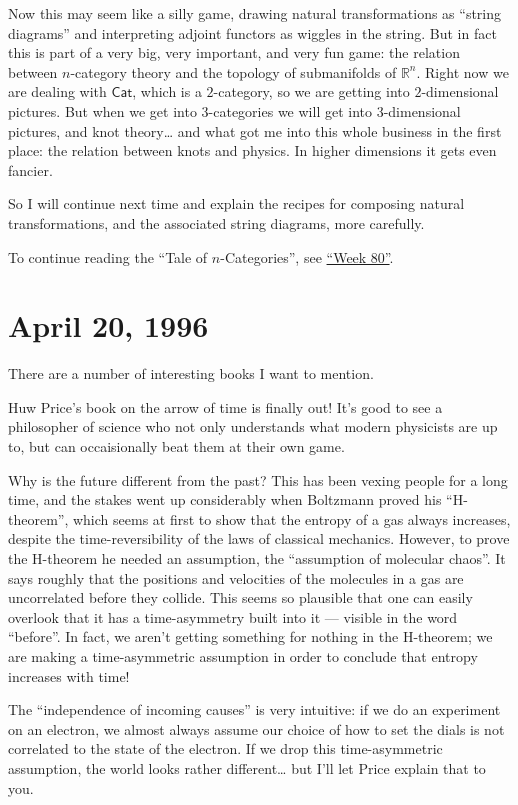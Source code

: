\documentclass{article}
\begin{document}
Now this may seem like a silly game, drawing natural transformations as
``string diagrams'' and interpreting adjoint functors as wiggles in the
string. But in fact this is part of a very big, very important, and very
fun game: the relation between \(n\)-category theory and the topology of
submanifolds of \(\mathbb{R}^n\). Right now we are dealing with
\(\mathsf{Cat}\), which is a \(2\)-category, so we are getting into
\(2\)-dimensional pictures. But when we get into \(3\)-categories we
will get into \(3\)-dimensional pictures, and knot theory\ldots{} and
what got me into this whole business in the first place: the relation
between knots and physics. In higher dimensions it gets even fancier.

So I will continue next time and explain the recipes for composing
natural transformations, and the associated string diagrams, more
carefully.

To continue reading the ``Tale of \(n\)-Categories'', see
\protect\hyperlink{week80}{``Week 80''}.



\hypertarget{week80}{%
\section{April 20, 1996}\label{week80}}

There are a number of interesting books I want to mention.

Huw Price's book on the arrow of time is finally out! It's good to see a
philosopher of science who not only understands what modern physicists
are up to, but can occaisionally beat them at their own game.

Why is the future different from the past? This has been vexing people
for a long time, and the stakes went up considerably when Boltzmann
proved his ``H-theorem'', which seems at first to show that the entropy
of a gas always increases, despite the time-reversibility of the laws of
classical mechanics. However, to prove the H-theorem he needed an
assumption, the ``assumption of molecular chaos''. It says roughly that
the positions and velocities of the molecules in a gas are uncorrelated
before they collide. This seems so plausible that one can easily
overlook that it has a time-asymmetry built into it --- visible in the
word ``before''. In fact, we aren't getting something for nothing in the
H-theorem; we are making a time-asymmetric assumption in order to
conclude that entropy increases with time!

The ``independence of incoming causes'' is very intuitive: if we do an
experiment on an electron, we almost always assume our choice of how to
set the dials is not correlated to the state of the electron. If we drop
this time-asymmetric assumption, the world looks rather
different\ldots{} but I'll let Price explain that to you.
\end{document}
